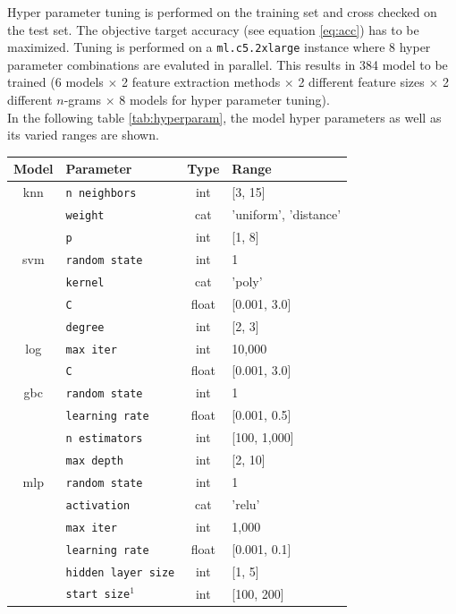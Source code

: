 \documentclass[a4paper,12pt,nottoc]{article}
\begin{document}
Hyper parameter tuning is performed on the training set and cross checked on the test set. The objective target accuracy (see equation \ref{eq:acc}) has to be maximized. Tuning is performed on a \texttt{ml.c5.2xlarge} instance where 8 hyper parameter combinations are evaluted in parallel. This results in 384 model to be trained (6 models $\times$ 2 feature extraction methods $\times$ 2 different feature sizes $\times$ 2 different $n$-grams $\times$ 8 models for hyper parameter tuning).\\

\noindent In the following table \ref{tab:hyperparam}, the model hyper parameters as well as its varied ranges are shown. 

\begin{table}[h]
\begin{center}
\begin{tabular}{| c | l | c | l |}
\hline
Model & Parameter & Type & Range \\
\hline
knn \cite{bib:knn} & \texttt{n neighbors} & int & [3, 15] \\
& \texttt{weight} & cat & 'uniform', 'distance'\\
& \texttt{p} & int & [1, 8] \\
\hline
svm \cite{bib:knn} & \texttt{random state} & int & 1 \\
& \texttt{kernel} & cat & 'poly' \\
& \texttt{C} & float & [0.001, 3.0] \\
& \texttt{degree} & int & [2, 3] \\
\hline
log \cite{bib:log} & \texttt{max iter} & int & 10,000 \\
& \texttt{C} & float & [0.001, 3.0] \\
\hline
gbc \cite{bib:gbc} & \texttt{random state} & int & 1	 \\
& \texttt{learning rate} & float & [0.001, 0.5] \\
& \texttt{n estimators} & int & [100, 1,000] \\
& \texttt{max depth} & int & [2, 10] \\
\hline
mlp \cite{bib:mlp} & \texttt{random state} & int & 1 \\
& \texttt{activation} & cat & 'relu' \\
& \texttt{max iter} & int & 1,000 \\
& \texttt{learning rate} & float & [0.001, 0.1] \\
& \texttt{hidden layer size} & int & [1, 5] \\
& \texttt{start size}$^\textrm{1}$ & int & [100, 200] \\

\end{tabular}
\end{center}
\end{table}
\end{document}
